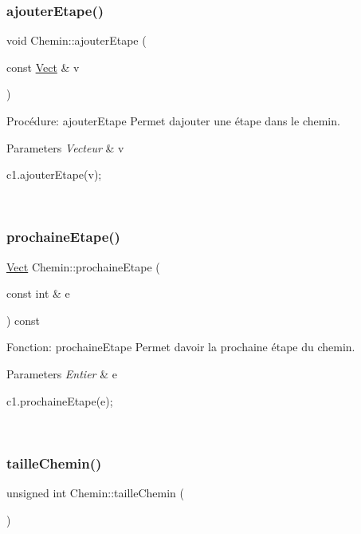 \subsubsection{\texorpdfstring{ajouter\+Etape()}{ajouterEtape()}}
{\footnotesize\ttfamily void Chemin\+::ajouter\+Etape (\begin{DoxyParamCaption}\item[{const \hyperlink{classVect}{Vect} \&}]{v }\end{DoxyParamCaption})}



Procédure\+: ajouter\+Etape Permet d\textquotesingle{}ajouter une étape dans le chemin. 


\begin{DoxyParams}{Parameters}
{\em Vecteur} & v 
\begin{DoxyCode}
c1.ajouterEtape(v);
\end{DoxyCode}
 \\
\hline
\end{DoxyParams}
\mbox{\label{classChemin_ad01a7ae60fd0b51cc18281c031ea9c97}} 
\subsubsection{\texorpdfstring{prochaine\+Etape()}{prochaineEtape()}}
{\footnotesize\ttfamily \hyperlink{classVect}{Vect} Chemin\+::prochaine\+Etape (\begin{DoxyParamCaption}\item[{const int \&}]{e }\end{DoxyParamCaption}) const}



Fonction\+: prochaine\+Etape Permet d\textquotesingle{}avoir la prochaine étape du chemin. 


\begin{DoxyParams}{Parameters}
{\em Entier} & e 
\begin{DoxyCode}
c1.prochaineEtape(e);
\end{DoxyCode}
 \\
\hline
\end{DoxyParams}
\mbox{\label{classChemin_a7153e040b29f294f30793a698cde23b3}} 
\subsubsection{\texorpdfstring{taille\+Chemin()}{tailleChemin()}}
{\footnotesize\ttfamily unsigned int Chemin\+::taille\+Chemin (\begin{DoxyParamCaption}{ }\end{DoxyParamCaption})}




